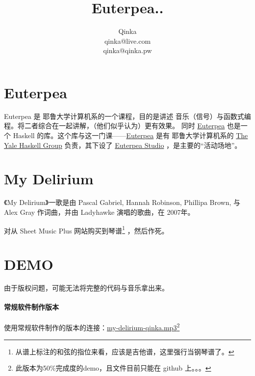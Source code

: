 \documentclass{ctexart}
\author{Qinka \\ qinka@live.com \\ qinka@qinka.pw}
\title{Euterpea..}
\begin{document}
\section{Euterpea}

Euterpea 是 耶鲁大学计算机系的一个课程，目的是讲述 音乐（信号）与函数式编程。将二者综合在一起讲解，（他们似乎认为）更有效果。
同时 \href{http://www.euterpea.com}{Euterpea} 也是一个 Haskell 的库。这个库与这一门课——\href{http://haskell.cs.yale.edu/euterpea/}{Euterpea}
是有 耶鲁大学计算机系的 \href{http://haskell.cs.yale.edu}{The Yale Haskell Group} 负责，其下设了
\href{http://haskell.cs.yale.edu/euterpea/euterpea-studio/}{Euterpea Studio} ，是主要的“活动场地”。

\section{My Delirium}

《My Delirium》一歌是由 Pascal Gabriel, Hannah Robinson, Phillipa Brown, 与 Alex Gray 作词曲，并由 Ladyhawke 演唱的歌曲，在 2007年。

对从 Sheet Music Plus 网站购买到琴谱\footnote{从谱上标注的和弦的指位来看，应该是吉他谱，这里强行当钢琴谱了。} ，然后作死。


\section{DEMO}

由于版权问题，可能无法将完整的代码与音乐拿出来。

\paragraph{常规软件制作版本}
使用常规软件制作的版本的连接：\href{/res/music/my-delirium-qinka.mp3}{my-delirium-qinka.mp3}\footnote{此版本为50\%完成度的demo，且文件目前只能在 github 上。。。}
\end{document}
